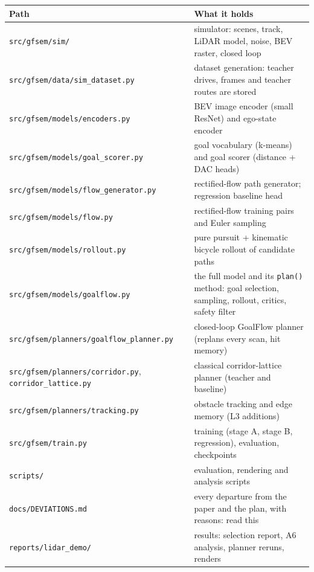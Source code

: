 \documentclass[11pt,a4paper]{article}
\newcommand{\code}[1]{\texttt{#1}}
\begin{document}
\begin{table}[H]
\small
\begin{tabularx}{\linewidth}{@{}lL@{}}
\toprule
Path & What it holds \\
\midrule
\code{src/gfsem/sim/} & simulator: scenes, track, LiDAR model, noise, BEV raster, closed loop \\
\code{src/gfsem/data/sim\_dataset.py} & dataset generation: teacher drives, frames and teacher routes are stored \\
\code{src/gfsem/models/encoders.py} & BEV image encoder (small ResNet) and ego-state encoder \\
\code{src/gfsem/models/goal\_scorer.py} & goal vocabulary (k-means) and goal scorer (distance + DAC heads) \\
\code{src/gfsem/models/flow\_generator.py} & rectified-flow path generator; regression baseline head \\
\code{src/gfsem/models/flow.py} & rectified-flow training pairs and Euler sampling \\
\code{src/gfsem/models/rollout.py} & pure pursuit + kinematic bicycle rollout of candidate paths \\
\code{src/gfsem/models/goalflow.py} & the full model and its \code{plan()} method: goal selection, sampling, rollout, critics, safety filter \\
\code{src/gfsem/planners/goalflow\_planner.py} & closed-loop GoalFlow planner (replans every scan, hit memory) \\
\code{src/gfsem/planners/corridor.py}, \code{corridor\_lattice.py} & classical corridor-lattice planner (teacher and baseline) \\
\code{src/gfsem/planners/tracking.py} & obstacle tracking and edge memory (L3 additions) \\
\code{src/gfsem/train.py} & training (stage A, stage B, regression), evaluation, checkpoints \\
\code{scripts/} & evaluation, rendering and analysis scripts \\
\code{docs/DEVIATIONS.md} & every departure from the paper and the plan, with reasons: read this \\
\code{reports/lidar\_demo/} & results: selection report, A6 analysis, planner reruns, renders \\
\bottomrule
\end{tabularx}
\end{table}
\end{document}
